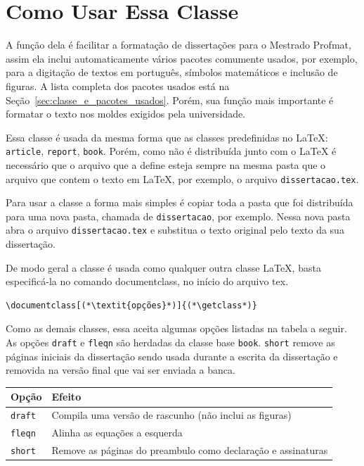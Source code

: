 \documentclass[fleqn]{profmat-cefet}
\newcommand{\texfile}  {\texttt{dissertacao.tex}}
\newcommand{\texdir}   {\texttt{dissertacao}}
\begin{document}
\section{Como Usar Essa Classe}
\label{sec:como_usar_essa_classe}

A função dela é facilitar a formatação de dissertações para o Mestrado Profmat,
assim ela inclui automaticamente vários pacotes comumente usados, por exemplo,
para a digitação de textos em português, símbolos matemáticos e inclusão de
figuras. A lista completa dos pacotes usados está na
Seção~\ref{sec:classe_e_pacotes_usados}. Porém, sua função mais importante 
é formatar o texto nos moldes exigidos pela universidade. 

Essa classe é usada da mesma forma que as classes predefinidas no 
\LaTeX{}: \lstinline!article!, \lstinline!report!, \lstinline!book!. 
Porém, como não é distribuída junto com o \LaTeX{} é necessário que o arquivo
que a define esteja sempre na mesma pasta que o arquivo que contem o texto em
\LaTeX{}, por exemplo, o arquivo \texfile{}.

Para usar a classe a forma mais simples é copiar toda a pasta que foi
distribuída para uma nova pasta, chamada de \texdir{}, por exemplo.
Nessa nova pasta abra o arquivo \texfile{} e substitua o texto
original pelo texto da sua dissertação.

De modo geral a classe é usada como qualquer outra classe \LaTeX, 
basta especificá-la no comando
\textsf{\mbox{documentclass}}, no início do arquivo \textsf{tex}.
\begin{lstlisting}
\documentclass[(*\textit{opções}*)]{(*\getclass*)}
\end{lstlisting}

Como as demais classes, essa aceita algumas opções listadas na tabela a seguir. 
As opções \lstinline!draft! e \lstinline!fleqn! são herdadas da classe base
\lstinline!book!. \lstinline!short! remove as páginas iniciais da
dissertação sendo usada durante a escrita da dissertação e removida na versão
final que vai ser enviada a banca.
\begin{center}
    \vspace{0.5\baselineskip}
    \begin{tabular}{p{2cm}p{11cm}}                                                           \hline
        Opção                 & Efeito                                                       \\ \hline
        {\lstinline!draft!}   & Compila uma versão de rascunho (não inclui as figuras)       \\
        {\lstinline!fleqn!}   & Alinha as equações a esquerda                                \\
        {\lstinline!short!}   & Remove as páginas do preambulo como declaração e assinaturas \\ \hline
    \end{tabular}
    \vspace{0.5\baselineskip}
\end{center}
\end{document}
